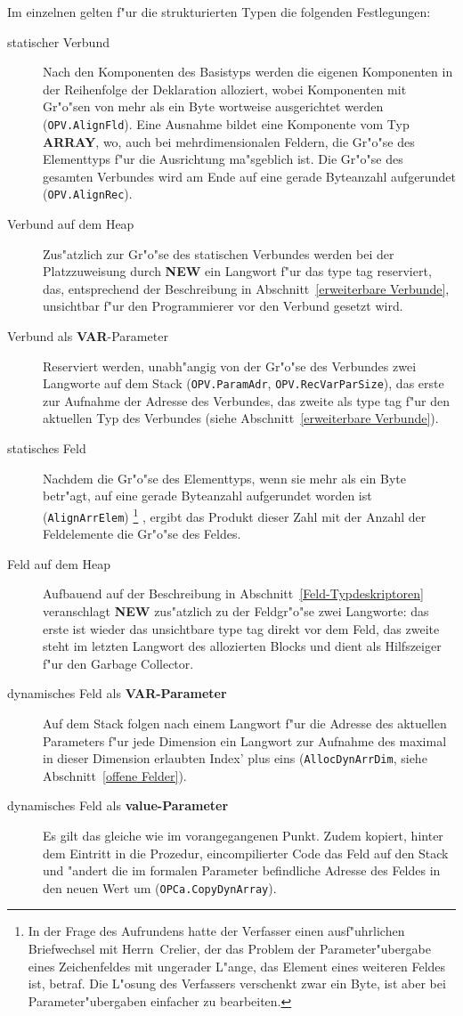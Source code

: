 Im einzelnen gelten f"ur die strukturierten Typen die folgenden
Festlegungen:
\begin{description}
\item[statischer Verbund] Nach den Komponenten des Basistyps werden die eigenen Komponenten
  in der Reihenfolge der Deklaration alloziert, wobei Komponenten mit Gr"o"sen
  von mehr als ein Byte wortweise ausgerichtet werden ({\tt OPV.AlignFld}).
  Eine Ausnahme bildet eine Komponente vom Typ {\bf ARRAY}, wo, auch bei
  mehrdimensionalen Feldern, die Gr"o"se des Elementtyps f"ur die Ausrichtung
  ma"sgeblich ist.
  Die Gr"o"se des gesamten Verbundes wird am Ende auf eine gerade Byteanzahl
  aufgerundet ({\tt OPV.AlignRec}).
\item[Verbund auf dem Heap] Zus"atzlich zur Gr"o"se des statischen Verbundes werden
  bei der Platzzuweisung durch {\bf NEW} ein Langwort f"ur das type tag reserviert,
  das, entsprechend der Beschreibung in Abschnitt~\ref{erweiterbare Verbunde},
  unsichtbar f"ur den Programmierer vor den Verbund gesetzt wird.
\item[Verbund als {\bf VAR}-Parameter] Reserviert werden, unabh"angig von
  der Gr"o"se des Verbundes zwei Langworte auf dem Stack ({\tt OPV.ParamAdr},
  {\tt OPV.RecVarParSize}),
  das erste zur Aufnahme der Adresse des Verbundes, das zweite als type tag
  f"ur den aktuellen Typ des Verbundes (siehe Abschnitt~\ref{erweiterbare Verbunde}).
\item[statisches Feld] Nachdem die Gr"o"se des Elementtyps, wenn sie mehr als
  ein Byte betr"agt, auf eine gerade Byteanzahl aufgerundet worden ist
  ({\tt AlignArrElem})%
  \footnote{In der Frage des Aufrundens hatte der Verfasser einen ausf"uhrlichen
   Briefwechsel mit Herrn~Crelier, der das %
   Problem der Parameter"ubergabe eines Zeichenfeldes mit ungerader L"ange,
   das Element eines weiteren Feldes ist, betraf.
   Die L"osung des Verfassers verschenkt zwar ein Byte, ist aber bei Parameter"ubergaben
   einfacher zu bearbeiten.}%
   , ergibt das Produkt dieser Zahl mit der Anzahl der Feldelemente
  die Gr"o"se des Feldes.
\item[Feld auf dem Heap] Aufbauend auf der Beschreibung in Abschnitt~\ref{Feld-Typdeskriptoren}
  veranschlagt {\bf NEW} zu\-s"atz\-lich zu der Feldgr"o"se zwei Langworte: das
  erste ist wieder das unsichtbare type tag direkt vor dem Feld, das zweite
  steht im letzten Langwort des allozierten Blocks und dient als Hilfszeiger
  f"ur den Garbage Collector.
\item[dynamisches Feld als {\bf VAR-Parameter}] Auf dem Stack folgen nach
  einem Langwort f"ur die Adresse des aktuellen Parameters f"ur jede
  Dimension ein Langwort zur Aufnahme des maxi\-mal in dieser Dimension erlaubten
  Index' plus eins ({\tt AllocDynArrDim}, siehe Abschnitt~\ref{offene Felder}).
\item[dynamisches Feld als {\bf value-Parameter}] Es gilt das gleiche wie
  im vorangegangenen Punkt.
  Zudem kopiert, hinter dem Eintritt in die Prozedur, eincompilierter Code
  das Feld auf den Stack und "andert die im formalen Parameter
  befindliche Adresse des Feldes in den neuen Wert um ({\tt OPCa.CopyDynArray}).
\end{description}


